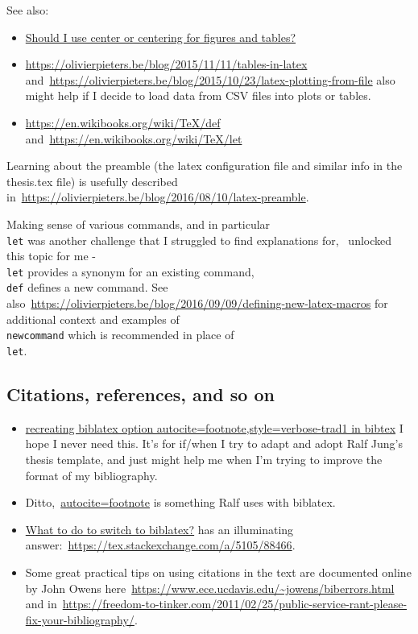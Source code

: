 See also:
\begin{itemize}
    \item \href{https://tex.stackexchange.com/questions/2651/should-i-use-center-or-centering-for-figures-and-tables}{Should I use center or centering for figures and tables?}
    \item \url{https://olivierpieters.be/blog/2015/11/11/tables-in-latex} and~\url{https://olivierpieters.be/blog/2015/10/23/latex-plotting-from-file} also might help if I decide to load data from CSV files into plots or tables.
    \item \url{https://en.wikibooks.org/wiki/TeX/def} and~\url{https://en.wikibooks.org/wiki/TeX/let}
\end{itemize}

Learning about the preamble (the latex configuration file and similar info in the thesis.tex file) is usefully described in~\url{https://olivierpieters.be/blog/2016/08/10/latex-preamble}. 

Making sense of various commands, and in particular~\texttt{\\let} was another challenge that I struggled to find explanations for,~\citep{tex_stackechange_let_and_def} unlocked this topic for me -~\texttt{\\let} provides a synonym for an existing command,~\texttt{\\def} defines a new command. See also~\url{https://olivierpieters.be/blog/2016/09/09/defining-new-latex-macros} for additional context and examples of~\texttt{\\newcommand} which is recommended in place of~\texttt{\\let}.

\subsection{Citations, references, and so on}

\begin{itemize}
    \item \href{https://tex.stackexchange.com/questions/14155/recreating-biblatex-option-autocite-footnote-style-verbose-trad1-in-bibtex}{recreating biblatex option autocite=footnote,style=verbose-trad1 in bibtex} I hope I never need this. It's for if/when I try to adapt and adopt Ralf Jung's thesis template, and just might help me when I'm trying to improve the format of my bibliography.
    \item Ditto,~\href{https://tex.stackexchange.com/questions/58576/autocite-footnote}{autocite=footnote} is something Ralf uses with biblatex.
    \item \href{https://tex.stackexchange.com/questions/5091/what-to-do-to-switch-to-biblatex}{What to do to switch to biblatex?} has an illuminating answer:~\url{https://tex.stackexchange.com/a/5105/88466}.
    \item Some great practical tips on using citations in the text are documented online by John Owens here~\url{https://www.ece.ucdavis.edu/~jowens/biberrors.html} and in~\url{https://freedom-to-tinker.com/2011/02/25/public-service-rant-please-fix-your-bibliography/}.
\end{itemize}

